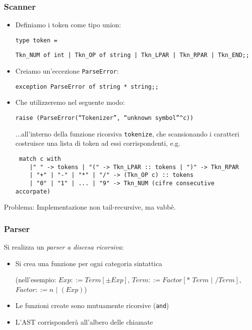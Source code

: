 \documentclass[a4paper,10pt]{article}
\begin{document}
\subsubsection{Scanner}
\begin{itemize}
 \item Definiamo i token come tipo union:

\quad \texttt{type token =}

\quad \texttt{Tkn\_NUM of int | Tkn\_OP of string | Tkn\_LPAR | Tkn\_RPAR | Tkn\_END;;}

\item Creiamo un'eccezione \texttt{ParseError}:

\quad \texttt{exception ParseError of string * string;;}

\item Che utilizzeremo nel seguente modo:

\quad \texttt{raise (ParseError(``Tokenizer'', ``unknown symbol''\^{}c))}

...all'interno della funzione ricorsiva \texttt{tokenize}, che scansionando i caratteri costruisce una lista di token ad essi corrispondenti, e.g.
\begin{lstlisting}
 match c with
    |" " -> tokens | "(" -> Tkn_LPAR :: tokens | ")" -> Tkn_RPAR
    | "+" | "-" | "*" | "/" -> (Tkn_OP c) :: tokens
    | "0" | "1" | ... | "9" -> Tkn_NUM (cifre consecutive accorpate)
\end{lstlisting}



\end{itemize}
Problema: Implementazione non tail-recursive, ma vabbè.
\newpage
\subsubsection{Parser}
Si realizza un \emph{parser a discesa ricorsiva}:
\begin{itemize}
 \item Si crea una funzione per ogni categoria sintattica 
 
 (nell'esempio: $Exp ::= Term[\pm Exp]$, \quad $Term ::= Factor [*\,\, Term \,\,\vert\,\, / Term]$, \quad $Factor ::= n \,\,|\,\, (Exp)$)
 \item Le funzioni create sono mutuamente ricorsive (\texttt{and})
 \item L'AST corrisponderà all'albero delle chiamate
\end{itemize}
\end{document}

